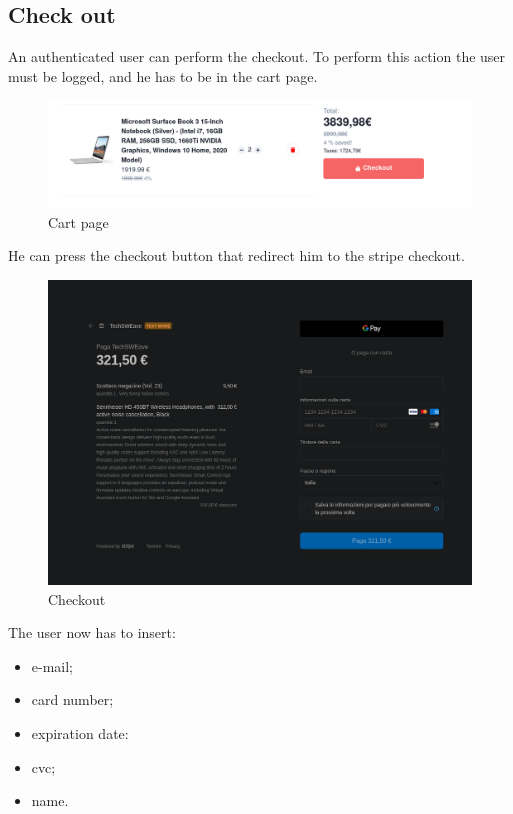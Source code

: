 \subsection{Check out}
An authenticated user can perform the checkout. To perform this action the user must be logged, and he has to be in the cart page.
\begin{figure}[!ht]
    \caption{Cart page}
    \vspace{10px}
    \includegraphics[scale=0.35]{../../../../Images/userManual/cart.png}
    \centering
\end{figure}
He can press the checkout button that redirect him to the stripe checkout.
\begin{figure}[!ht]
    \caption{Checkout}
    \vspace{10px}
    \includegraphics[scale=0.3]{../../../../Images/userManual/checkout.png}
    \centering
\end{figure}
The user now has to insert:
\begin{itemize}
    \item e-mail;
    \item card number;
    \item expiration date:
    \item cvc;
    \item name.
\end{itemize}
